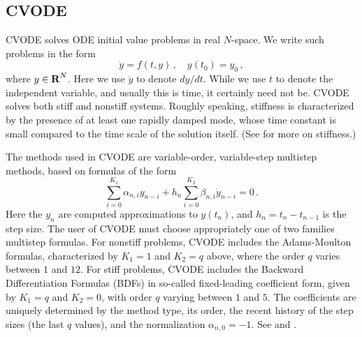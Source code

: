 \subsection{CVODE}\label{ss:cvode}

CVODE solves ODE initial value problems in real $N$-space.  We
write such problems in the form
\begin{equation}\label{ODE}
  \dot{y} = f(t,y) \, ,\quad y(t_0) = y_0 \, ,
\end{equation}
where $y \in \mbox{\bf R}^N$.
Here we use $\dot{y}$ to denote $dy/dt$.  While we use $t$ to denote
the independent variable, and usually this is time, it certainly need
not be.  CVODE solves both stiff and nonstiff systems.  Roughly
speaking, stiffness is characterized by the presence of at least one
rapidly damped mode, whose time constant is small compared to the time
scale of the solution itself.  (See \cite{HaWa:91} for more on stiffness.)

The methods used in CVODE are variable-order, variable-step multistep
methods, based on formulas of the form
\begin{equation*}
 \sum_{i = 0}^{K_1} \alpha_{n,i} y_{n-i} +
     h_n \sum_{i = 0}^{K_2} \beta_{n,i} \dot{y}_{n-i} = 0 \, .
\end{equation*}
Here the $y_n$ are computed approximations to $y(t_n)$, and
$h_n = t_n - t_{n-1}$ is the step size.  The user of CVODE must choose
appropriately one of two families multistep formulas.  For nonstiff problems,
CVODE includes the Adams-Moulton formulas, characterized by $K_1 = 1$
and $K_2 = q$ above, where the order $q$ varies between $1$ and $12$.
For stiff problems, CVODE includes the Backward Differentiation
Formulas (BDFs) in so-called fixed-leading coefficient form, given by
$K_1 = q$ and $K_2 = 0$, with order $q$ varying between $1$ and $5$.
The coefficients are uniquely determined by the method type, its
order, the recent history of the step sizes (the last $q$ values),
and the normalization $\alpha_{n,0} = -1$.  See \cite{ByHi:75} and
\cite{JaSD:80}.


